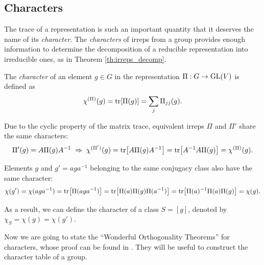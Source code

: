 \subsection{Characters} \label{sec:characters}

The trace of a representation is such an important quantity that it deserves the name of its \textit{character}. The \textit{characters} of irreps from a group provides enough information to determine the decomposition of a reducible representation into irreducible ones, as in Theorem \ref{th:irreps_decomp}.

\begin{definition} \label{def:character}
The \textit{character} of an element $g \in G$ in the representation $\Pi: G \to {\text{GL}}(V)$ is defined as
\begin{equation} \label{eq:character}
\chi^{(\Pi)}(g) = \tr[\Pi(g)] = \sum_{j} \Pi_{jj}(g).
\end{equation}
\end{definition}

\begin{lemma} \label{lemma:character_equiv_sameclass}
Due to the cyclic property of the matrix trace, equivalent irreps \(\Pi\) and \(\Pi'\) share the same characters:
\begin{equation} \label{eq:trace_equivalent_reps_chi}
\Pi'(g) = A\Pi(g)A^{-1} \; \Rightarrow \; \chi^{(\Pi')}(g) = \tr[A \Pi(g) A^{-1}] =  \tr[A^{-1}A \Pi(g)] = \chi^{(\Pi)}(g).
\end{equation}

Elements \(g\) and \(g' = aga^{-1}\) belonging to the same conjugacy class also have the same character:
\begin{equation} \label{eq:trace_same_class_chi}
\chi(g') = \chi(aga^{-1}) = \tr[\Pi(aga^{-1})] = \tr[\Pi(a)\Pi(g)\Pi(a^{-1})] = \tr[\Pi(a)^{-1}\Pi(a)\Pi(g)] = \chi(g).
\end{equation}

As a result, we can define the character of a class \(S = [g]\), denoted by \(\chi_S = \chi(g) = \chi(g')\).
\end{lemma}

\n

Now we are going to state the ``Wonderful Orthogonality Theorems'' for characters, whose proof can be found in \cite{dresselhaus, hamermesh}. They will be useful to construct the character table of a group.

